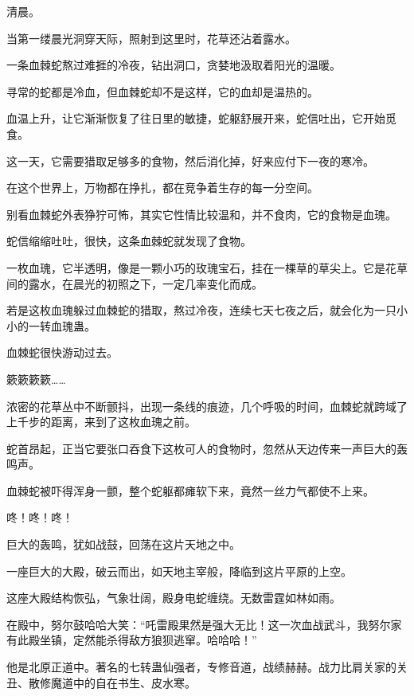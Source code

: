 
\begin{this_body}



清晨。

当第一缕晨光洞穿天际，照射到这里时，花草还沾着露水。

一条血棘蛇熬过难捱的冷夜，钻出洞口，贪婪地汲取着阳光的温暖。

寻常的蛇都是冷血，但血棘蛇却不是这样，它的血却是温热的。

血温上升，让它渐渐恢复了往日里的敏捷，蛇躯舒展开来，蛇信吐出，它开始觅食。

这一天，它需要猎取足够多的食物，然后消化掉，好来应付下一夜的寒冷。

在这个世界上，万物都在挣扎，都在竞争着生存的每一分空间。

别看血棘蛇外表狰狞可怖，其实它性情比较温和，并不食肉，它的食物是血瑰。

蛇信缩缩吐吐，很快，这条血棘蛇就发现了食物。

一枚血瑰，它半透明，像是一颗小巧的玫瑰宝石，挂在一棵草的草尖上。它是花草间的露水，在晨光的初照之下，一定几率变化而成。

若是这枚血瑰躲过血棘蛇的猎取，熬过冷夜，连续七天七夜之后，就会化为一只小小的一转血瑰蛊。

血棘蛇很快游动过去。

簌簌簌簌……

浓密的花草丛中不断颤抖，出现一条线的痕迹，几个呼吸的时间，血棘蛇就跨域了上千步的距离，来到了这枚血瑰之前。

蛇首昂起，正当它要张口吞食下这枚可人的食物时，忽然从天边传来一声巨大的轰鸣声。

血棘蛇被吓得浑身一颤，整个蛇躯都瘫软下来，竟然一丝力气都使不上来。

咚！咚！咚！

巨大的轰鸣，犹如战鼓，回荡在这片天地之中。

一座巨大的大殿，破云而出，如天地主宰般，降临到这片平原的上空。

这座大殿结构恢弘，气象壮阔，殿身电蛇缠绕。无数雷霆如林如雨。

在殿中，努尔鼓哈哈大笑：“吒雷殿果然是强大无比！这一次血战武斗，我努尔家有此殿坐镇，定然能杀得敌方狼狈逃窜。哈哈哈！”

他是北原正道中。著名的七转蛊仙强者，专修音道，战绩赫赫。战力比肩关家的关丑、散修魔道中的自在书生、皮水寒。


\end{this_body}
